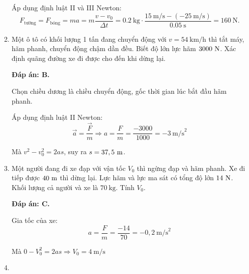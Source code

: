 \begin{enumerate}[label=\bfseries Câu \arabic*:]
{		Áp dụng định luật II và III Newton:
		$$F_\text{tường}=F_\text{bóng}=ma=m\dfrac {v-v_0}{\Delta t}=\SI{0,2}{\kilogram}\cdot\dfrac{\SI{15}{\meter/\second}-(\SI{-25}{\meter/\second})}{\SI{0,05}{\second}}=\SI{160}{\newton}.$$
		
		
	}
	\item {}
	
	\cauhoi
	{Một ô tô có khối lượng 1 tấn đang chuyển động với $v=54\ \text{km/h}$ thì tắt máy, hãm phanh, chuyển động chậm dần đều. Biết độ lớn lực hãm $3000\ \text N$. Xác định quãng đường xe đi được cho đến khi dừng lại.
	}
	
	\loigiai
	{\textbf{Đáp án: B.}
		
		Chọn chiều dương là chiều chuyển động, gốc thời gian lúc bắt đầu hãm phanh.
		
		Áp dụng định luật II Newton:
		\[ \vec a = \dfrac {\vec F}{m} \Rightarrow a=\dfrac{F}{m} = \dfrac{-3000}{1000} = -3\ \text{m/s}^2\]
		
		Mà $v^2 - v_0 ^2 = 2as$, suy ra $s=37,5\ \text m$.
		
		
	}
	\item {}
	
	\cauhoi
	{Một người đang đi xe đạp với vận tốc $V_0$ thì ngừng đạp và hãm phanh. Xe đi tiếp được $40\ \text m$ thì dừng lại. Lực hãm và lực ma sát có tổng độ lớn $14\ \text N$. Khối lượng cả người và xe là $70\ \text {kg}$. Tính $V_0$.
	}
	
	\loigiai
	{\textbf{Đáp án: C.}	
		
		Gia tốc của xe:
		\[a=\dfrac{F}{m}=\dfrac{-14}{70} = -0,2\ \text{m/s}^2\]
		
		Mà $0-V_0^2 = 2as \Rightarrow V_0 = 4\ \text{m/s}$
		
		
	}
	\item {}
	

\end{enumerate}
